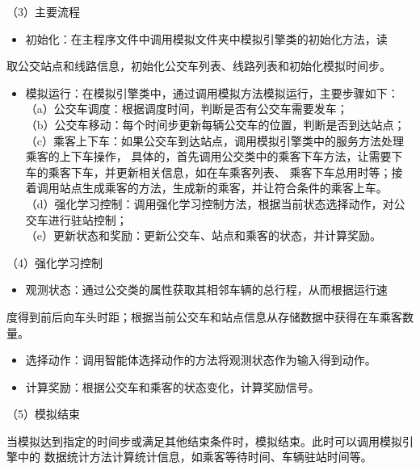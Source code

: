 （3）主要流程
\begin{itemize}
    \item 初始化：在主程序文件中调用模拟文件夹中模拟引擎类的初始化方法，读
\end{itemize}
取公交站点和线路信息，初始化公交车列表、线路列表和初始化模拟时间步。
\begin{itemize}
    \item 模拟运行：在模拟引擎类中，通过调用模拟方法模拟运行，主要步骤如下：\\
    （a）公交车调度：根据调度时间，判断是否有公交车需要发车；\\
（b）公交车移动：每个时间步更新每辆公交车的位置，判断是否到达站点；\\
（c）乘客上下车：如果公交车到达站点，调用模拟引擎类中的服务方法处理乘客的上下车操作，
具体的，首先调用公交类中的乘客下车方法，让需要下车的乘客下车，并更新相关信息，如在车乘客列表、
乘客下车总用时等；接着调用站点生成乘客的方法，生成新的乘客，并让符合条件的乘客上车。 \\
（d）强化学习控制：调用强化学习控制方法，根据当前状态选择动作，对公交车进行驻站控制；\\
（e）更新状态和奖励：更新公交车、站点和乘客的状态，并计算奖励。
\end{itemize}

（4）强化学习控制

\begin{itemize}
    \item 观测状态：通过公交类的属性获取其相邻车辆的总行程，从而根据运行速
\end{itemize}
度得到前后向车头时距；根据当前公交车和站点信息从存储数据中获得在车乘客数量。

\begin{itemize}
    \item 选择动作：调用智能体选择动作的方法将观测状态作为输入得到动作。
\end{itemize}

\begin{itemize}
    \item 计算奖励：根据公交车和乘客的状态变化，计算奖励信号。
\end{itemize}

（5）模拟结束

当模拟达到指定的时间步或满足其他结束条件时，模拟结束。此时可以调用模拟引擎中的
数据统计方法计算统计信息，如乘客等待时间、车辆驻站时间等。




